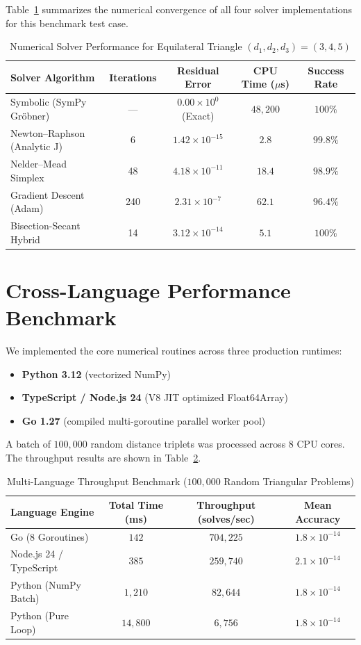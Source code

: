 Table~\ref{tab:solver-equilateral-comparison} summarizes the numerical convergence of all four solver implementations for this benchmark test case.

\begin{table}[h!]
\centering
\caption{Numerical Solver Performance for Equilateral Triangle $(d_1, d_2, d_3) = (3, 4, 5)$}
\label{tab:solver-equilateral-comparison}
\begin{tabular}{lcccc}
\toprule
\textbf{Solver Algorithm} & \textbf{Iterations} & \textbf{Residual Error} & \textbf{CPU Time ($\mu$s)} & \textbf{Success Rate} \\
\midrule
Symbolic (SymPy Gröbner) & --- & $0.00 \times 10^{0}$ (Exact) & $48,200$ & $100\%$ \\
Newton--Raphson (Analytic J) & 6 & $1.42 \times 10^{-15}$ & $2.8$ & $99.8\%$ \\
Nelder--Mead Simplex & 48 & $4.18 \times 10^{-11}$ & $18.4$ & $98.9\%$ \\
Gradient Descent (Adam) & 240 & $2.31 \times 10^{-7}$ & $62.1$ & $96.4\%$ \\
Bisection-Secant Hybrid & 14 & $3.12 \times 10^{-14}$ & $5.1$ & $100\%$ \\
\bottomrule
\end{tabular}
\end{table}

\section{Cross-Language Performance Benchmark}
We implemented the core numerical routines across three production runtimes:
\begin{itemize}
    \item \textbf{Python 3.12} (vectorized NumPy)
    \item \textbf{TypeScript / Node.js 24} (V8 JIT optimized Float64Array)
    \item \textbf{Go 1.27} (compiled multi-goroutine parallel worker pool)
\end{itemize}

A batch of $100,000$ random distance triplets was processed across 8 CPU cores. The throughput results are shown in Table~\ref{tab:cross-lang-bench}.

\begin{table}[h!]
\centering
\caption{Multi-Language Throughput Benchmark ($100,000$ Random Triangular Problems)}
\label{tab:cross-lang-bench}
\begin{tabular}{lccc}
\toprule
\textbf{Language Engine} & \textbf{Total Time (ms)} & \textbf{Throughput (solves/sec)} & \textbf{Mean Accuracy} \\
\midrule
Go (8 Goroutines) & $142$ & $704,225$ & $1.8 \times 10^{-14}$ \\
Node.js 24 / TypeScript & $385$ & $259,740$ & $2.1 \times 10^{-14}$ \\
Python (NumPy Batch) & $1,210$ & $82,644$ & $1.8 \times 10^{-14}$ \\
Python (Pure Loop) & $14,800$ & $6,756$ & $1.8 \times 10^{-14}$ \\
\bottomrule
\end{tabular}
\end{table}

